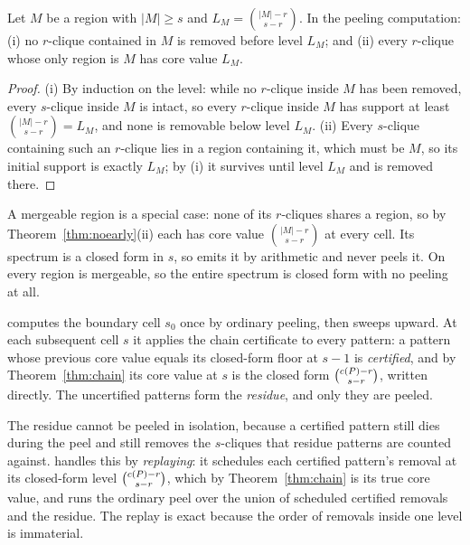 \begin{theorem}
\label{thm:noearly}
Let $M$ be a region with $|M|\ge s$ and $L_M=\binom{|M|-r}{s-r}$.
%
In the peeling computation: (i) no $r$-clique contained in $M$ is removed before level $L_M$; and (ii) every $r$-clique whose only region is $M$ has core value $L_M$.
\end{theorem}
\begin{proof}
(i) By induction on the level: while no $r$-clique inside $M$ has been removed, every $s$-clique inside $M$ is intact, so every $r$-clique inside $M$ has support at least $\binom{|M|-r}{s-r}=L_M$, and none is removable below level $L_M$.
%
(ii) Every $s$-clique containing such an $r$-clique lies in a region containing it, which must be $M$, so its initial support is exactly $L_M$; by (i) it survives until level $L_M$ and is removed there.
\end{proof}

\begin{remark}
A mergeable region is a special case: none of its $r$-cliques shares a region, so by Theorem~\ref{thm:noearly}(ii) each has core value $\binom{|M|-r}{s-r}$ at every cell.
%
Its spectrum is a closed form in $s$, so \specnd{} emits it by arithmetic and never peels it.
%
On \daWUK{} every region is mergeable, so the entire spectrum is closed form with no peeling at all.
\end{remark}

\specnd{} computes the boundary cell $s_0$ once by ordinary peeling, then sweeps upward.
%
At each subsequent cell $s$ it applies the chain certificate to every pattern: a pattern whose previous core value equals its closed-form floor at $s{-}1$ is \textit{certified}, and by Theorem~\ref{thm:chain} its core value at $s$ is the closed form $\binom{c(P)-r}{s-r}$, written directly.
%
The uncertified patterns form the \textit{residue}, and only they are peeled.

The residue cannot be peeled in isolation, because a certified pattern still dies during the peel and still removes the $s$-cliques that residue patterns are counted against.
%
\specnd{} handles this by \textit{replaying}: it schedules each certified pattern's removal at its closed-form level $\binom{c(P)-r}{s-r}$, which by Theorem~\ref{thm:chain} is its true core value, and runs the ordinary peel over the union of scheduled certified removals and the residue.
%
The replay is exact because the order of removals inside one level is immaterial.

